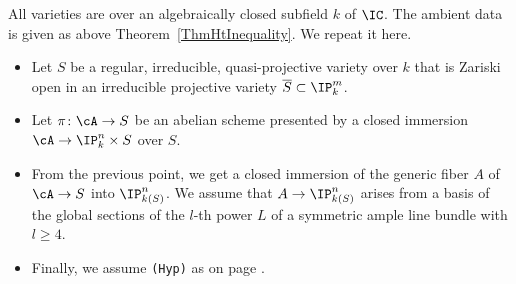 All varieties are over an algebraically closed subfield $k$ of $\IC$.
The ambient data is given as above Theorem~\ref{ThmHtInequality}. We
repeat it here.
\begin{itemize}
  \item Let $S$ be a regular, irreducible, quasi-projective variety over  $k$
  that is Zariski open in an irreducible projective variety
  $\overline{S}\subset \IP_k^m$.
  \item Let $\pi\colon \cA\rightarrow S$ be an abelian scheme
     presented by a closed immersion $\cA\rightarrow\IP_k^n\times S$ over
     $S$. %
  \item
    From the previous point, we get a closed immersion of the generic
    fiber $A$ of $\cA\rightarrow S$  into  $\IP_{k(S)}^n$.
    We assume that $A\rightarrow \IP_{k(S)}^n$
    arises from a basis of the global sections of
    the $l$-th power $L$ of a symmetric ample
    line bundle with $l\ge 4$.
  \item
    Finally, we assume \texttt{(Hyp)} as on page \pageref{def:hyp}.
\end{itemize}

